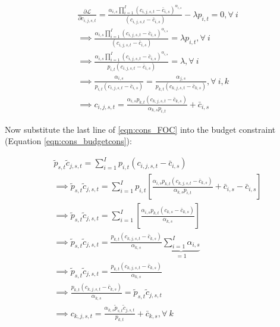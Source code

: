       \begin{equation} \label{eqn:cons_FOC}
      \begin{split}
       & \frac{\partial \mathcal{L}}{\partial c_{i,j,s,t}} = \frac{\alpha_{i,s} \prod_{i=1}^I \left( c_{i,j,s,t} - \bar c_{i,s} \right) ^{\alpha_{i,s}}}{(c_{i,j,s,t}-\bar{c}_{i,s})}-\lambda p_{i,t} = 0, \forall \ i  \\
       & \implies  \frac{\alpha_{i,s} \prod_{i=1}^I \left( c_{i,j,s,t} - \bar c_{i,s} \right) ^{\alpha_{i,s}}}{(c_{i,j,s,t}-\bar{c}_{i,s})} = \lambda p_{i,t}, \forall \ i \\
       & \implies  \frac{\alpha_{i,s} \prod_{i=1}^I \left( c_{i,j,s,t} - \bar c_{i,s} \right) ^{\alpha_{i,s}}}{ p_{i,t}(c_{i,j,s,t}-\bar{c}_{i,s})} = \lambda, \forall \ i \\
       & \implies \frac{\alpha_{i,s}}{p_{i,t}(c_{i,j,s,t}-\bar{c}_{i,s})}=\frac{\alpha_{j,s}}{p_{k,t}(c_{k,j,s,t}-\bar{c}_{k,s})}, \forall \ i,k \\
       & \implies c_{i,j,s,t}= \frac{\alpha_{i,s} p_{k,t}(c_{k,j,s,t}-\bar{c}_{k,s})}{\alpha_{k,s} p_{i,t}} + \bar{c}_{i,s}
       \end{split}
    \end{equation}
    
    Now substitute the last line of \ref{eqn:cons_FOC} into the budget constraint (Equation \ref{eqn:cons_budgetcons}):
    
          \begin{equation} \label{eqn:cons_solve}
      \begin{split}
       & \tilde{p}_{s,t}\tilde{c}_{j,s,t} = \sum_{i=1}^{I}p_{i,t}(c_{i,j,s,t}-\bar{c}_{i,s}) \\
       & \implies  \tilde{p}_{s,t}\tilde{c}_{j,s,t} = \sum_{i=1}^{I}p_{i,t}\left[ \frac{\alpha_{i,s} p_{k,t}(c_{k,j,s,t}-\bar{c}_{k,s})}{\alpha_{k,s} p_{i,t}} + \bar{c}_{i,s}- \bar{c}_{i,s}\right] \\
       & \implies  \tilde{p}_{s,t}\tilde{c}_{j,s,t} = \sum_{i=1}^{I}\left[ \frac{\alpha_{i,s} p_{k,t}(c_{k,s}-\bar{c}_{k,s})}{\alpha_{k,s}}\right] \\
       & \implies  \tilde{p}_{s,t}\tilde{c}_{j,s,t} = \frac{ p_{k,t}(c_{k,j,s,t}-\bar{c}_{k,s})}{\alpha_{k,s}} \underbrace{\sum_{i=1}^{I}\alpha_{i,s}}_{=1} \\	
        & \implies  \tilde{p}_{s,t}\tilde{c}_{j,s,t} = \frac{ p_{k,t}(c_{k,j,s,t}-\bar{c}_{k,s})}{\alpha_{k,s}} \\
        & \implies  \frac{ p_{k,t}(c_{k,j,s,t}-\bar{c}_{k,s})}{\alpha_{k,s}}  = \tilde{p}_{s,t}\tilde{c}_{j,s,t}   \\	
        & \implies  c_{k,j,s,t}  = \frac{\alpha_{k,s} \tilde{p}_{s,t}\tilde{c}_{j,s,t}}{p_{k,t}} + \bar{c}_{k,s},  \forall \ k  \\	
       \end{split}
    \end{equation}
    
